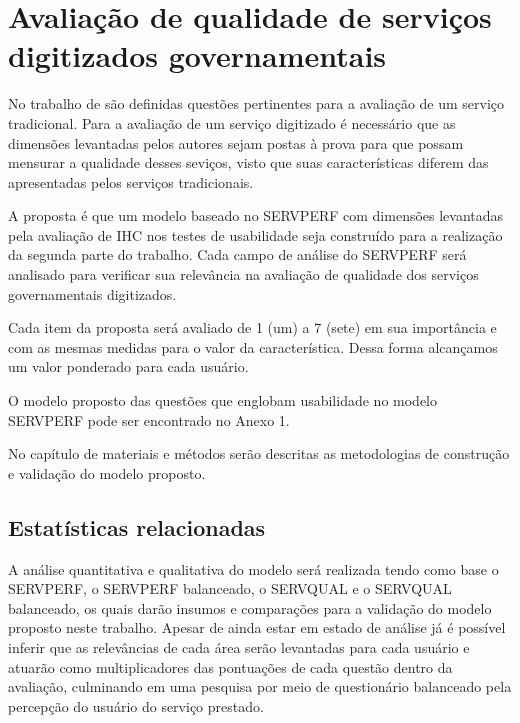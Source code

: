 \section{Avaliação de qualidade de serviços digitizados governamentais}
No trabalho de \cite{cronintaylor1992} são definidas questões pertinentes para a avaliação de um serviço tradicional. Para a avaliação de um serviço digitizado é necessário que as dimensões levantadas pelos autores sejam postas à prova para que possam mensurar a qualidade desses seviços, visto que suas características diferem das apresentadas pelos serviços tradicionais.

A proposta é que um modelo baseado no SERVPERF com dimensões levantadas pela avaliação de IHC nos testes de usabilidade seja construído para a realização da segunda parte do trabalho. Cada campo de análise do SERVPERF será analisado para verificar sua relevância na avaliação de qualidade dos serviços governamentais digitizados.

Cada item da proposta será avaliado de 1 (um) a 7 (sete) em sua importância e com as mesmas medidas para o valor da característica. Dessa forma alcançamos um valor ponderado para cada usuário.

O modelo proposto das questões que englobam usabilidade no modelo SERVPERF pode ser encontrado no Anexo 1.

No capítulo de materiais e métodos serão descritas as metodologias de construção e validação do modelo proposto.

\subsection{Estatísticas relacionadas}

A análise quantitativa e qualitativa do modelo será realizada tendo como base o SERVPERF, o SERVPERF balanceado, o SERVQUAL e o SERVQUAL balanceado, os quais darão insumos e comparações para a validação do modelo proposto neste trabalho. Apesar de ainda estar em estado de análise já é possível inferir que as relevâncias de cada área serão levantadas para cada usuário e atuarão como multiplicadores das pontuações de cada questão dentro da avaliação, culminando em uma pesquisa por meio de questionário balanceado pela percepção do usuário do serviço prestado.